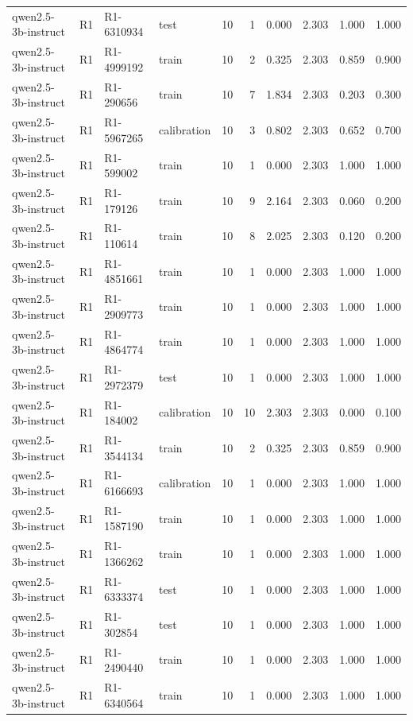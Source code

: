 \begin{table}
\begin{tabular}{llllrrrrrr}
qwen2.5-3b-instruct & R1 & R1-6310934 & test & 10 & 1 & 0.000 & 2.303 & 1.000 & 1.000 \\
qwen2.5-3b-instruct & R1 & R1-4999192 & train & 10 & 2 & 0.325 & 2.303 & 0.859 & 0.900 \\
qwen2.5-3b-instruct & R1 & R1-290656 & train & 10 & 7 & 1.834 & 2.303 & 0.203 & 0.300 \\
qwen2.5-3b-instruct & R1 & R1-5967265 & calibration & 10 & 3 & 0.802 & 2.303 & 0.652 & 0.700 \\
qwen2.5-3b-instruct & R1 & R1-599002 & train & 10 & 1 & 0.000 & 2.303 & 1.000 & 1.000 \\
qwen2.5-3b-instruct & R1 & R1-179126 & train & 10 & 9 & 2.164 & 2.303 & 0.060 & 0.200 \\
qwen2.5-3b-instruct & R1 & R1-110614 & train & 10 & 8 & 2.025 & 2.303 & 0.120 & 0.200 \\
qwen2.5-3b-instruct & R1 & R1-4851661 & train & 10 & 1 & 0.000 & 2.303 & 1.000 & 1.000 \\
qwen2.5-3b-instruct & R1 & R1-2909773 & train & 10 & 1 & 0.000 & 2.303 & 1.000 & 1.000 \\
qwen2.5-3b-instruct & R1 & R1-4864774 & train & 10 & 1 & 0.000 & 2.303 & 1.000 & 1.000 \\
qwen2.5-3b-instruct & R1 & R1-2972379 & test & 10 & 1 & 0.000 & 2.303 & 1.000 & 1.000 \\
qwen2.5-3b-instruct & R1 & R1-184002 & calibration & 10 & 10 & 2.303 & 2.303 & 0.000 & 0.100 \\
qwen2.5-3b-instruct & R1 & R1-3544134 & train & 10 & 2 & 0.325 & 2.303 & 0.859 & 0.900 \\
qwen2.5-3b-instruct & R1 & R1-6166693 & calibration & 10 & 1 & 0.000 & 2.303 & 1.000 & 1.000 \\
qwen2.5-3b-instruct & R1 & R1-1587190 & train & 10 & 1 & 0.000 & 2.303 & 1.000 & 1.000 \\
qwen2.5-3b-instruct & R1 & R1-1366262 & train & 10 & 1 & 0.000 & 2.303 & 1.000 & 1.000 \\
qwen2.5-3b-instruct & R1 & R1-6333374 & test & 10 & 1 & 0.000 & 2.303 & 1.000 & 1.000 \\
qwen2.5-3b-instruct & R1 & R1-302854 & test & 10 & 1 & 0.000 & 2.303 & 1.000 & 1.000 \\
qwen2.5-3b-instruct & R1 & R1-2490440 & train & 10 & 1 & 0.000 & 2.303 & 1.000 & 1.000 \\
qwen2.5-3b-instruct & R1 & R1-6340564 & train & 10 & 1 & 0.000 & 2.303 & 1.000 & 1.000 \\

\end{tabular}
\end{table}
